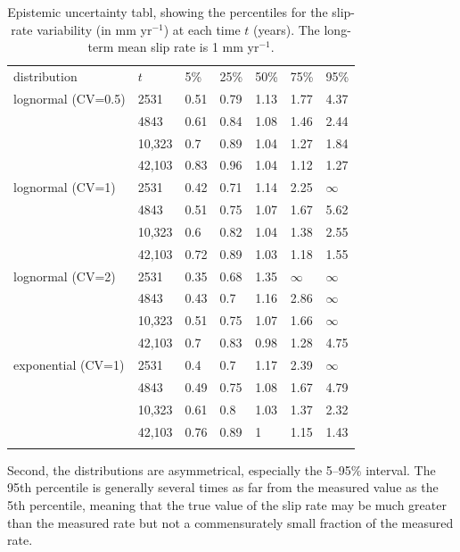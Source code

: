 \documentclass[se]{copernicus}
\begin{document}
\begin{table}[t]
\begin{tabular}{lllllll}
\tophline
distribution  &  $t$     &     5\%  &   25\% &    50\% &   75\% &  95\% \\
\middlehline
lognormal (CV=0.5) & 2531  &  0.51 &  0.79 &  1.13 &  1.77 &  4.37 \\
      & 4843  &  0.61 &  0.84 &  1.08 &  1.46 &  2.44 \\
      & 10,323 &   0.7 &  0.89 &  1.04 &  1.27 &  1.84 \\
      & 42,103 &  0.83 &  0.96 &  1.04 &  1.12 &  1.27 \\
lognormal (CV=1) & 2531  &  0.42 &  0.71 &  1.14 &  2.25 &   $\infty$ \\
      & 4843  &  0.51 &  0.75 &  1.07 &  1.67 &  5.62 \\
      & 10,323 &   0.6 &  0.82 &  1.04 &  1.38 &  2.55 \\
      & 42,103 &  0.72 &  0.89 &  1.03 &  1.18 &  1.55 \\
lognormal (CV=2) & 2531  &  0.35 &  0.68 &  1.35 &   $\infty$ &   $\infty$ \\
      & 4843  &  0.43 &   0.7 &  1.16 &  2.86 &   $\infty$ \\
      & 10,323 &  0.51 &  0.75 &  1.07 &  1.66 &   $\infty$ \\
      & 42,103 &   0.7 &  0.83 &  0.98 &  1.28 &  4.75 \\
exponential (CV=1) & 2531  &   0.4 &   0.7 &  1.17 &  2.39 &   $\infty$ \\
      & 4843  &  0.49 &  0.75 &  1.08 &  1.67 &  4.79 \\
      & 10,323 &  0.61 &   0.8 &  1.03 &  1.37 &  2.32 \\
      & 42,103 &  0.76 &  0.89 &     1 &  1.15 &  1.43 \\
\bottomhline
\end{tabular}
  \caption{Epistemic uncertainty tabl, showing the percentiles for the 
    slip-rate variability (in mm yr$^{-1}$) at each time $t$ (years). The 
    long-term mean slip rate is 1 mm yr$^{-1}$. \label{ep_unc_table}}
\end{table}

Second, the distributions are asymmetrical, especially the 5--95\%
interval. The 95th percentile is generally several times as far from the
measured value as the 5th percentile, meaning that the true value of the
slip rate may be much greater than the measured rate but not a
commensurately small fraction of the measured rate.
\end{document}
